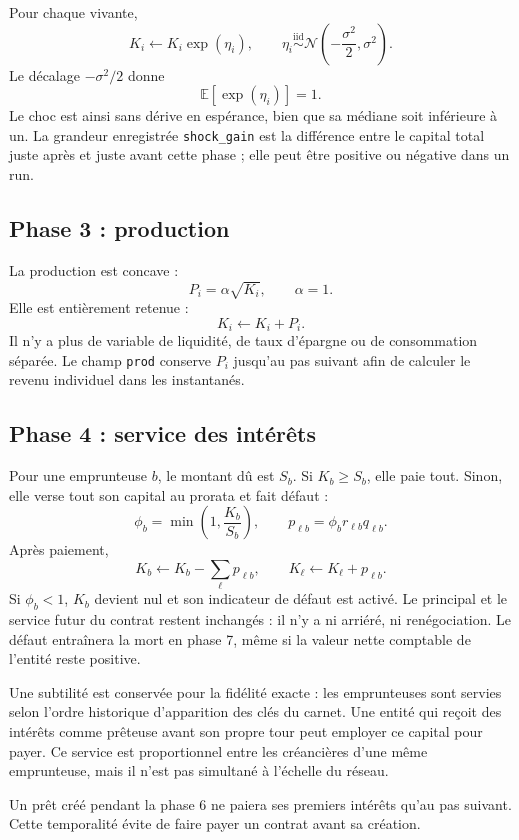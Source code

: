 \documentclass[11pt,a4paper]{article}
\newcommand{\code}[1]{\texttt{#1}}
\newcommand{\E}{\mathbb{E}}
\begin{document}
Pour chaque vivante,
\[
K_i\leftarrow K_i\exp(\eta_i),
\qquad
\eta_i\overset{\mathrm{iid}}{\sim}
\mathcal N\!\left(-\frac{\sigma^2}{2},\sigma^2\right).
\]
Le décalage $-\sigma^2/2$ donne
\[
\E[\exp(\eta_i)]=1.
\]
Le choc est ainsi sans dérive en espérance, bien que sa médiane soit
inférieure à un. La grandeur enregistrée
\code{shock\_gain} est la différence entre le capital total juste après et
juste avant cette phase ; elle peut être positive ou négative dans un run.

\subsection{Phase 3 : production}

La production est concave :
\[
P_i=\alpha\sqrt{K_i},\qquad \alpha=1.
\]
Elle est entièrement retenue :
\[
K_i\leftarrow K_i+P_i.
\]
Il n'y a plus de variable de liquidité, de taux d'épargne ou de consommation
séparée. Le champ \code{prod} conserve $P_i$ jusqu'au pas suivant afin de
calculer le revenu individuel dans les instantanés.

\subsection{Phase 4 : service des intérêts}

Pour une emprunteuse $b$, le montant dû est $S_b$. Si $K_b\geq S_b$, elle
paie tout. Sinon, elle verse tout son capital au prorata et fait défaut :
\[
\phi_b=\min\left(1,\frac{K_b}{S_b}\right),
\qquad
p_{\ell b}=\phi_b r_{\ell b}q_{\ell b}.
\]
Après paiement,
\[
K_b\leftarrow K_b-\sum_\ell p_{\ell b},
\qquad
K_\ell\leftarrow K_\ell+p_{\ell b}.
\]
Si $\phi_b<1$, $K_b$ devient nul et son indicateur de défaut est activé. Le
principal et le service futur du contrat restent inchangés : il n'y a ni
arriéré, ni renégociation. Le défaut entraînera la mort en phase 7, même si
la valeur nette comptable de l'entité reste positive.

Une subtilité est conservée pour la fidélité exacte : les emprunteuses sont
servies selon l'ordre historique d'apparition des clés du carnet. Une entité
qui reçoit des intérêts comme prêteuse avant son propre tour peut employer
ce capital pour payer. Ce service est proportionnel entre les créancières
d'une même emprunteuse, mais il n'est pas simultané à l'échelle du réseau.

Un prêt créé pendant la phase 6 ne paiera ses premiers intérêts qu'au pas
suivant. Cette temporalité évite de faire payer un contrat avant sa création.
\end{document}
